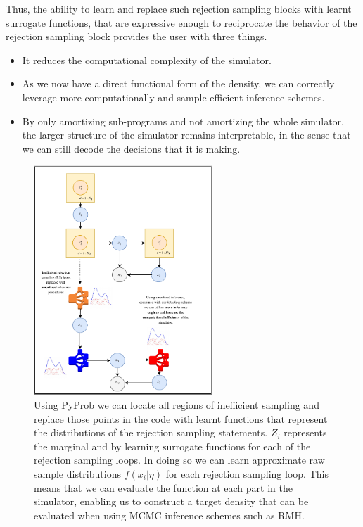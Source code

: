 \documentclass{article}
\begin{document}

Thus, the ability to learn and replace such rejection
sampling blocks with learnt surrogate functions, that are expressive enough to 
reciprocate the behavior of the rejection sampling block provides the user with three things. 
\begin{itemize}
  \item It reduces the computational complexity of the simulator.  
  \item As we now have a direct functional form of the density, we can correctly leverage more computationally and sample efficient inference schemes. 
  \item By only amortizing sub-programs and not amortizing the whole simulator, the larger structure of the simulator remains interpretable, in the sense that we can 
  still decode the decisions that it is making.  
\end{itemize}

\begin{figure}
  \includegraphics[width=0.6\textwidth, height=0.6\textheight,keepaspectratio]{amoritized_rejection.pdf}
    \caption{Using PyProb we can locate all regions of inefficient sampling 
    and replace those points in the code with learnt functions that represent
    the distributions of the rejection sampling statements. $Z_{i}$ represents the marginal and 
    by learning surrogate functions for each of the rejection sampling loops.
    In doing so we can learn approximate raw sample distributions $f(x_{i} | \eta)$ for each
    rejection sampling loop. This means that we can evaluate the function at each part in the simulator, enabling
    us to construct a target density that can be evaluated when using MCMC inference schemes such as RMH.}
    \label{fig:amortized_sampling}
\end{figure}
\end{document}
